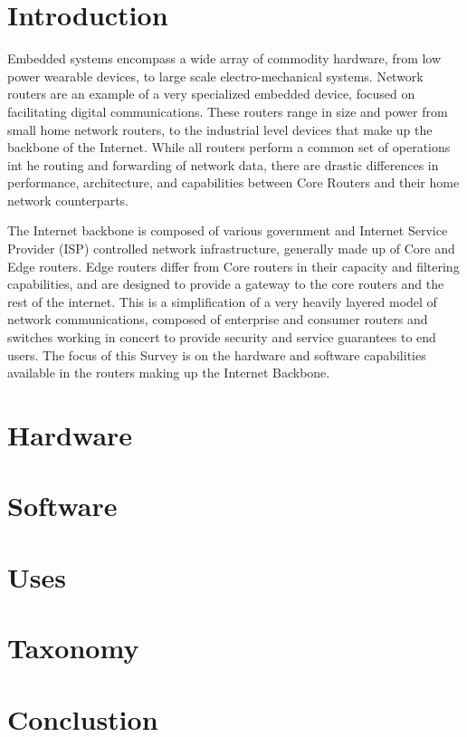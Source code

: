 \section{Introduction}
Embedded systems encompass a wide array of commodity hardware, from low power wearable devices, to large scale electro-mechanical systems. Network routers are an example of a very specialized embedded device, focused on facilitating digital communications. These routers range in size and power from small home network routers, to the industrial level devices that make up the backbone of the Internet. While all routers perform a common set of operations int he routing and forwarding of network data, there are drastic differences in performance, architecture, and capabilities between Core Routers and their home network counterparts.

The Internet backbone is composed of various government and Internet Service Provider (ISP) controlled network infrastructure, generally made up of Core and Edge routers. Edge routers differ from Core routers in their capacity and filtering capabilities, and are designed to provide a gateway to the core routers and the rest of the internet. This is a simplification of a very heavily layered model of network communications, composed of enterprise and consumer routers and switches working in concert to provide security and service guarantees to end users. The focus of this Survey is on the hardware and software capabilities available in the routers making up the Internet Backbone.


\section{Hardware}

\section{Software}

\section{Uses}


\section{Taxonomy}

\section{Conclustion}

